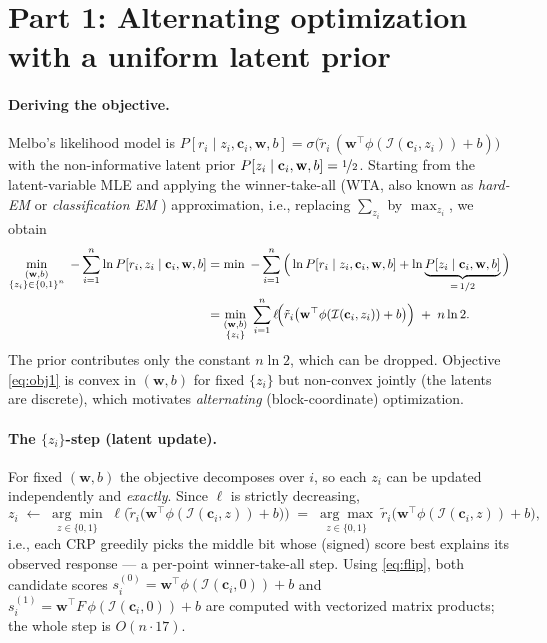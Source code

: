 \documentclass{article}
\newcommand{\vw}{\mathbf{w}}
\newcommand{\vc}{\mathbf{c}}
\newcommand{\ins}{\mathcal{I}}
\begin{document}
\section{Part 1: Alternating optimization with a uniform latent prior}

\paragraph{Deriving the objective.}
Melbo's likelihood model is
$P[r_i \mid z_i, \vc_i, \vw, b] = \sigma\!\big(\tilde r_i\,(\vw^\top \phi(\ins(\vc_i, z_i)) + b)\big)$
with the non-informative latent prior $P[z_i \mid \vc_i, \vw, b] = \nicefrac{1}{2}$.
Starting from the latent-variable MLE and applying the winner-take-all (WTA, also known as
\emph{hard-EM} or \emph{classification EM} \citep{celeux1992classification}) approximation,
i.e., replacing $\sum_{z_i}$ by $\max_{z_i}$, we obtain
\begin{align}
  \min_{\substack{(\vw, b)\\ \{z_i\}\in\{0,1\}^n}}
  \; -\sum_{i=1}^{n} \ln P[r_i, z_i \mid \vc_i, \vw, b]
  &= \min \; -\sum_{i=1}^{n} \Big( \ln P[r_i \mid z_i, \vc_i, \vw, b]
     + \ln \underbrace{P[z_i \mid \vc_i, \vw, b]}_{=\,1/2} \Big) \notag \\
  &= \min_{\substack{(\vw, b)\\ \{z_i\}}}
     \; \sum_{i=1}^{n} \ell\!\Big( \tilde r_i \big( \vw^\top \phi(\ins(\vc_i, z_i)) + b \big) \Big)
     \;+\; n \ln 2 .
  \label{eq:obj1}
\end{align}
The prior contributes only the constant $n \ln 2$, which can be dropped. Objective
\eqref{eq:obj1} is convex in $(\vw, b)$ for fixed $\{z_i\}$ but non-convex jointly (the
latents are discrete), which motivates \emph{alternating} (block-coordinate) optimization.

\paragraph{The $\{z_i\}$-step (latent update).}
For fixed $(\vw, b)$ the objective decomposes over $i$, so each $z_i$ can be updated
independently and \emph{exactly}. Since $\ell$ is strictly decreasing,
\begin{equation}
  \label{eq:zstep1}
  z_i \;\leftarrow\; \underset{z \in \{0,1\}}{\arg\min}\;
  \ell\!\Big( \tilde r_i \big( \vw^\top \phi(\ins(\vc_i, z)) + b \big) \Big)
  \;=\; \underset{z \in \{0,1\}}{\arg\max}\;
  \tilde r_i \big( \vw^\top \phi(\ins(\vc_i, z)) + b \big),
\end{equation}
i.e., each CRP greedily picks the middle bit whose (signed) score best explains its observed
response --- a per-point winner-take-all step. Using \eqref{eq:flip}, both candidate scores
$s_i^{(0)} = \vw^\top \phi(\ins(\vc_i, 0)) + b$ and $s_i^{(1)} = \vw^\top F\,\phi(\ins(\vc_i, 0)) + b$
are computed with vectorized matrix products; the whole step is $O(n \cdot 17)$.
\end{document}
